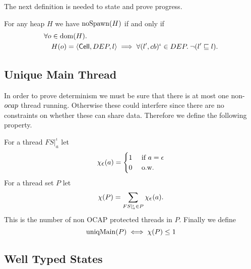 The next definition is needed to state and prove progress.
\begin{definition}[No Spawn]
  For any heap $H$ we have $\mbox{$\mathrm{noSpawn}$}(H)$ if and only if
  \begin{equation}
    \begin{aligned}
      \forall o &\in \mbox{$\mathrm{dom}$}(H). \\
        & H(o) = \mbox{$\langle \mbox{$\mathsf{Cell}$}{}, DEP, l \rangle$} \implies 
        \forall (l', cb)^\iota \in DEP. \: \lnot (l' \sqsubseteq l).
    \end{aligned}
  \end{equation}
\end{definition}

\subsection{Unique Main Thread}%
\label{sub:unique_main_thread}

In order to prove determinism we must be sure that there is at most one
non-$\mbox{$ocap$}$ thread running. Otherwise these could interfere since there are no
constraints on whether these can share data. Therefore we define the following
property.
\begin{definition}
  For a thread $FS|_a^\iota$ let
  \begin{equation*}
    \chi_{\mbox{$\epsilon$}}(a) =
    \begin{cases}
      1 & \text{ if } a = \mbox{$\epsilon$} \\
      0 & \text{ o.w. }
    \end{cases}
  \end{equation*}
  For a thread set $P$ let
  \begin{equation*}
    \chi(P) = \sum_{FS|_a^\iota \in P} \chi_{\mbox{$\epsilon$}}(a).
  \end{equation*}
  This is the number of non OCAP protected threads in $P$. Finally we define
  \begin{equation*}
    \mbox{$\mathrm{uniqMain}$}(P) \iff \chi(P) \leq 1
  \end{equation*}
\end{definition}


\subsection{Well Typed States}%
\label{sub:well_typed_states}

